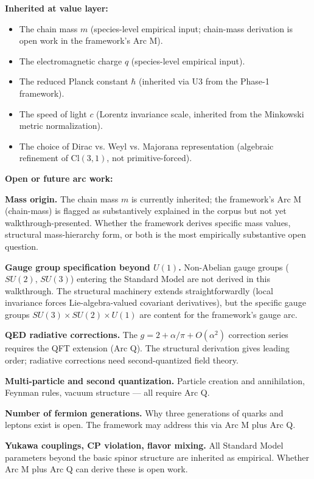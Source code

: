 \documentclass[11pt,a4paper]{article}
\begin{document}
\textbf{Inherited at value layer:}

\begin{itemize}[noitemsep]
  \item The chain mass $m$ (species-level empirical input; chain-mass derivation is open work in the framework's Arc M).
  \item The electromagnetic charge $q$ (species-level empirical input).
  \item The reduced Planck constant $\hbar$ (inherited via U3 from the Phase-1 framework).
  \item The speed of light $c$ (Lorentz invariance scale, inherited from the Minkowski metric normalization).
  \item The choice of Dirac vs. Weyl vs. Majorana representation (algebraic refinement of $\mathrm{Cl}(3,1)$, not primitive-forced).
\end{itemize}

\textbf{Open or future arc work:}

\textbf{Mass origin.} The chain mass $m$ is currently inherited; the framework's Arc M (chain-mass) is flagged as substantively explained in the corpus but not yet walkthrough-presented. Whether the framework derives specific mass values, structural mass-hierarchy form, or both is the most empirically substantive open question.

\textbf{Gauge group specification beyond $U(1)$.} Non-Abelian gauge groups ($SU(2)$, $SU(3)$) entering the Standard Model are not derived in this walkthrough. The structural machinery extends straightforwardly (local invariance forces Lie-algebra-valued covariant derivatives), but the specific gauge groups $SU(3)\times SU(2)\times U(1)$ are content for the framework's gauge arc.

\textbf{QED radiative corrections.} The $g = 2 + \alpha/\pi + O(\alpha^2)$ correction series requires the QFT extension (Arc Q). The structural derivation gives leading order; radiative corrections need second-quantized field theory.

\textbf{Multi-particle and second quantization.} Particle creation and annihilation, Feynman rules, vacuum structure --- all require Arc Q.

\textbf{Number of fermion generations.} Why three generations of quarks and leptons exist is open. The framework may address this via Arc M plus Arc Q.

\textbf{Yukawa couplings, CP violation, flavor mixing.} All Standard Model parameters beyond the basic spinor structure are inherited as empirical. Whether Arc M plus Arc Q can derive these is open work.
\end{document}
